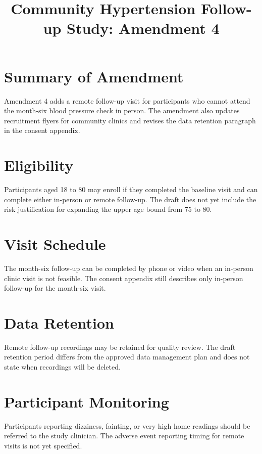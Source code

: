 \documentclass{article}
\begin{document}
        \title{Community Hypertension Follow-up Study: Amendment 4}
        \maketitle

        \section{Summary of Amendment}
        Amendment 4 adds a remote follow-up visit for participants who cannot
        attend the month-six blood pressure check in person. The amendment also
        updates recruitment flyers for community clinics and revises the data
        retention paragraph in the consent appendix.

        \section{Eligibility}
        Participants aged 18 to 80 may enroll if they completed the baseline
        visit and can complete either in-person or remote follow-up. The draft
        does not yet include the risk justification for expanding the upper age
        bound from 75 to 80.

        \section{Visit Schedule}
        The month-six follow-up can be completed by phone or video when an
        in-person clinic visit is not feasible. The consent appendix still
        describes only in-person follow-up for the month-six visit.

        \section{Data Retention}
        Remote follow-up recordings may be retained for quality review. The
        draft retention period differs from the approved data management plan
        and does not state when recordings will be deleted.

        \section{Participant Monitoring}
        Participants reporting dizziness, fainting, or very high home readings
        should be referred to the study clinician. The adverse event reporting
        timing for remote visits is not yet specified.
\end{document}
